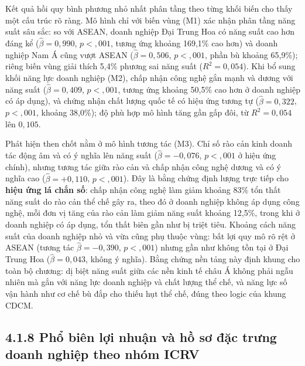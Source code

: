 \documentclass[
  a4paper,
  13pt]{extreport}
\begin{document}
Kết quả hồi quy bình phương nhỏ nhất phân tầng theo từng khối biến cho
thấy một cấu trúc rõ ràng. Mô hình chỉ với biến vùng (M1) xác nhận phân
tầng năng suất sâu sắc: so với ASEAN, doanh nghiệp Đại Trung Hoa có năng
suất cao hơn đáng kể (\(\hat{\beta} = 0{,}990\), \(p < {,}001\), tương
ứng khoảng 169,1\% cao hơn) và doanh nghiệp Nam Á cũng vượt ASEAN
(\(\hat{\beta} = 0{,}506\), \(p < {,}001\), phần bù khoảng 65,9\%);
riêng biến vùng giải thích 5,4\% phương sai năng suất
(\(R^2 = 0{,}054\)). Khi bổ sung khối năng lực doanh nghiệp (M2), chấp
nhận công nghệ gắn mạnh và dương với năng suất
(\(\hat{\beta} = 0{,}409\), \(p < {,}001\), tương ứng khoảng 50,5\% cao
hơn ở doanh nghiệp có áp dụng), và chứng nhận chất lượng quốc tế có hiệu
ứng tương tự (\(\hat{\beta} = 0{,}322\), \(p < {,}001\), khoảng 38,0\%);
độ phù hợp mô hình tăng gần gấp đôi, từ \(R^2 = 0{,}054\) lên
\(0{,}105\).

Phát hiện then chốt nằm ở mô hình tương tác (M3). Chỉ số rào cản kinh
doanh tác động âm và có ý nghĩa lên năng suất
(\(\hat{\beta} = -0{,}076\), \(p < {,}001\) ở hiệu ứng chính), nhưng
tương tác giữa rào cản và chấp nhận công nghệ dương và có ý nghĩa cao
(\(\hat{\beta} = +0{,}110\), \(p < {,}001\)). Đây là bằng chứng định
lượng trực tiếp cho \textbf{hiệu ứng lá chắn số}: chấp nhận công nghệ
làm giảm khoảng 83\% tổn thất năng suất do rào cản thể chế gây ra, theo
đó ở doanh nghiệp không áp dụng công nghệ, mỗi đơn vị tăng của rào cản
làm giảm năng suất khoảng 12,5\%, trong khi ở doanh nghiệp có áp dụng,
tổn thất biên gần như bị triệt tiêu. Khoảng cách năng suất của doanh
nghiệp nhỏ và vừa cũng phụ thuộc vùng: bất lợi quy mô rõ rệt ở ASEAN
(tương tác \(\hat{\beta} = -0{,}390\), \(p < {,}001\)) nhưng gần như
không tồn tại ở Đại Trung Hoa (\(\hat{\beta} = 0{,}043\), không ý
nghĩa). Bằng chứng nền tảng này định khung cho toàn bộ chương: dị biệt
năng suất giữa các nền kinh tế châu Á không phải ngẫu nhiên mà gắn với
năng lực doanh nghiệp và chất lượng thể chế, và năng lực số vận hành như
cơ chế bù đắp cho thiếu hụt thể chế, đúng theo logic của khung CDCM.

\hypertarget{phux1ed5-biuxean-lux1ee3i-nhuux1eadn-vuxe0-hux1ed3-sux1a1-ux111ux1eb7c-trux1b0ng-doanh-nghiux1ec7p-theo-nhuxf3m-icrv}{%
\subsection{4.1.8 Phổ biên lợi nhuận và hồ sơ đặc trưng doanh nghiệp
theo nhóm
ICRV}\label{phux1ed5-biuxean-lux1ee3i-nhuux1eadn-vuxe0-hux1ed3-sux1a1-ux111ux1eb7c-trux1b0ng-doanh-nghiux1ec7p-theo-nhuxf3m-icrv}}
\end{document}
